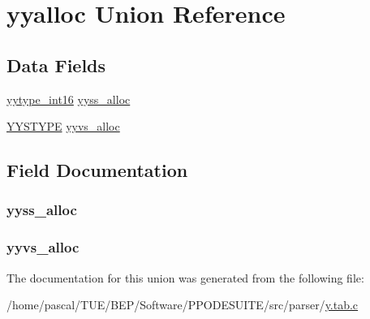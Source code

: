 \hypertarget{unionyyalloc}{\section{yyalloc Union Reference}
\label{unionyyalloc}
}
\subsection*{Data Fields}
\begin{DoxyCompactItemize}
\item 
\hyperlink{y_8tab_8c_ade5b97f0021a4f6c5922ead3744ab297}{yytype\-\_\-int16} \hyperlink{unionyyalloc_a26e6b311cc4eccee5ad7ac3840622b22}{yyss\-\_\-alloc}
\item 
\hyperlink{union_y_y_s_t_y_p_e}{Y\-Y\-S\-T\-Y\-P\-E} \hyperlink{unionyyalloc_a891efbd91c083d987c99bd4be8d06f50}{yyvs\-\_\-alloc}
\end{DoxyCompactItemize}


\subsection{Field Documentation}
\hypertarget{unionyyalloc_a26e6b311cc4eccee5ad7ac3840622b22}{
\subsubsection[{yyss\-\_\-alloc}]{ yyss\-\_\-alloc}}\label{unionyyalloc_a26e6b311cc4eccee5ad7ac3840622b22}
\hypertarget{unionyyalloc_a891efbd91c083d987c99bd4be8d06f50}{
\subsubsection[{yyvs\-\_\-alloc}]{ yyvs\-\_\-alloc}}\label{unionyyalloc_a891efbd91c083d987c99bd4be8d06f50}


The documentation for this union was generated from the following file\-:\begin{DoxyCompactItemize}
\item 
/home/pascal/\-T\-U\-E/\-B\-E\-P/\-Software/\-P\-P\-O\-D\-E\-S\-U\-I\-T\-E/src/parser/\hyperlink{y_8tab_8c}{y.\-tab.\-c}\end{DoxyCompactItemize}
